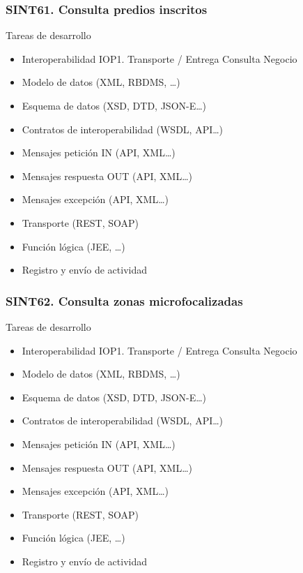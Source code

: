 \documentclass[
  paper=a4,
  ,captions=tableheading
]{scrartcl}
\providecommand{\tightlist}{%
  \setlength{\itemsep}{0pt}\setlength{\parskip}{0pt}}
\begin{document}
\subsubsection{SINT61. Consulta predios
inscritos}\label{sec:sint61.-consulta-predios-inscritos}

Tareas de desarrollo

\begin{itemize}
\tightlist
\item
  Interoperabilidad IOP1. Transporte / Entrega Consulta Negocio\\
\item
  Modelo de datos (XML, RBDMS, \ldots)
\item
  Esquema de datos (XSD, DTD, JSON-E\ldots)
\item
  Contratos de interoperabilidad (WSDL, API\ldots)
\item
  Mensajes petición IN (API, XML\ldots)
\item
  Mensajes respuesta OUT (API, XML\ldots)
\item
  Mensajes excepción (API, XML\ldots)
\item
  Transporte (REST, SOAP)
\item
  Función lógica (JEE, \ldots)
\item
  Registro y envío de actividad
\end{itemize}

\subsubsection{SINT62. Consulta zonas
microfocalizadas}\label{sec:sint62.-consulta-zonas-microfocalizadas}

Tareas de desarrollo

\begin{itemize}
\tightlist
\item
  Interoperabilidad IOP1. Transporte / Entrega Consulta Negocio\\
\item
  Modelo de datos (XML, RBDMS, \ldots)
\item
  Esquema de datos (XSD, DTD, JSON-E\ldots)
\item
  Contratos de interoperabilidad (WSDL, API\ldots)
\item
  Mensajes petición IN (API, XML\ldots)
\item
  Mensajes respuesta OUT (API, XML\ldots)
\item
  Mensajes excepción (API, XML\ldots)
\item
  Transporte (REST, SOAP)
\item
  Función lógica (JEE, \ldots)
\item
  Registro y envío de actividad
\end{itemize}
\end{document}
